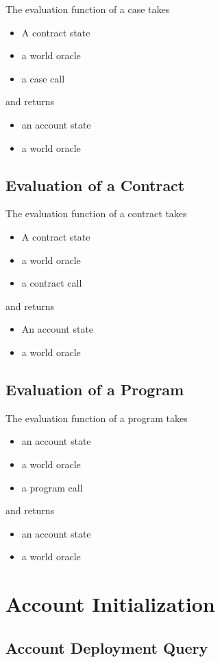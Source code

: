 \documentclass{book}
\begin{document}
The evaluation function of a case takes
\begin{itemize}
\item A contract state
\item a world oracle
\item a case call
\end{itemize}
and returns
\begin{itemize}
\item an account state
\item a world oracle
\end{itemize}

\subsection{Evaluation of a Contract}

The evaluation function of a contract takes
\begin{itemize}
\item A contract state
\item a world oracle
\item a contract call
\end{itemize}
and returns
\begin{itemize}
\item An account state
\item a world oracle
\end{itemize}

\subsection{Evaluation of a Program}

The evaluation function of a program takes
\begin{itemize}
\item an account state
\item a world oracle
\item a program call
\end{itemize}
and returns
\begin{itemize}
\item an account state
\item a world oracle
\end{itemize}

\section{Account Initialization}

\subsection{Account Deployment Query}
\end{document}
